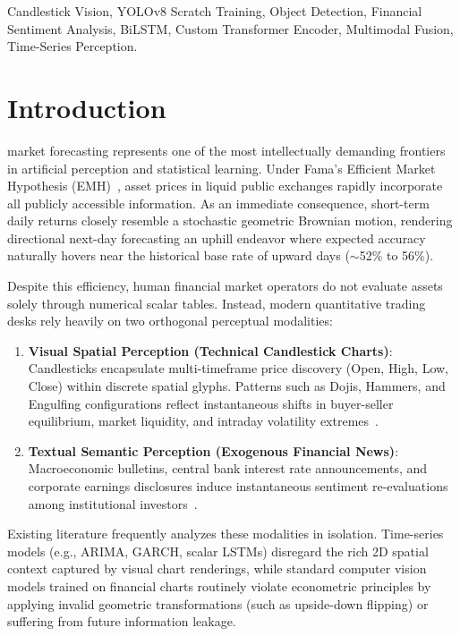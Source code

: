 \documentclass[10pt,journal]{IEEEtran}
\begin{document}
\begin{IEEEkeywords}
Candlestick Vision, YOLOv8 Scratch Training, Object Detection, Financial Sentiment Analysis, BiLSTM, Custom Transformer Encoder, Multimodal Fusion, Time-Series Perception.
\end{IEEEkeywords}

\section{Introduction}
 market forecasting represents one of the most intellectually demanding frontiers in artificial perception and statistical learning. Under Fama's Efficient Market Hypothesis (EMH)~\cite{fama1970}, asset prices in liquid public exchanges rapidly incorporate all publicly accessible information. As an immediate consequence, short-term daily returns closely resemble a stochastic geometric Brownian motion, rendering directional next-day forecasting an uphill endeavor where expected accuracy naturally hovers near the historical base rate of upward days ($\sim$52\% to 56\%).

Despite this efficiency, human financial market operators do not evaluate assets solely through numerical scalar tables. Instead, modern quantitative trading desks rely heavily on two orthogonal perceptual modalities:
\begin{enumerate}
  \item \textbf{Visual Spatial Perception (Technical Candlestick Charts)}: Candlesticks encapsulate multi-timeframe price discovery (Open, High, Low, Close) within discrete spatial glyphs. Patterns such as Dojis, Hammers, and Engulfing configurations reflect instantaneous shifts in buyer-seller equilibrium, market liquidity, and intraday volatility extremes~\cite{lo2000,joly2018}.
  \item \textbf{Textual Semantic Perception (Exogenous Financial News)}: Macroeconomic bulletins, central bank interest rate announcements, and corporate earnings disclosures induce instantaneous sentiment re-evaluations among institutional investors~\cite{malo2014}.
\end{enumerate}

Existing literature frequently analyzes these modalities in isolation. Time-series models (e.g., ARIMA, GARCH, scalar LSTMs) disregard the rich 2D spatial context captured by visual chart renderings, while standard computer vision models trained on financial charts routinely violate econometric principles by applying invalid geometric transformations (such as upside-down flipping) or suffering from future information leakage.
\end{document}
